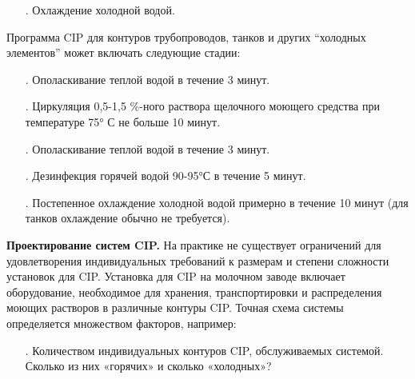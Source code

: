 {\begin{itemize}[leftmargin=2.15cm, labelwidth=0.65cm, labelsep=0.0cm]
	\item[\theitemcntr. ] Охлаждение холодной водой.
	\addtocounter{itemcntr}{1}
	
	\addtocounter{itemcntr}{1}
	
	\setcounter{itemcntr}{1}
\end{itemize}   

\par \redline Программа CIP для контуров трубопроводов, танков и других “холодных элементов” может включать следующие стадии:

\begin{itemize}[leftmargin=2.15cm, labelwidth=0.65cm, labelsep=0.0cm] 
	
	\item[\theitemcntr. ] Ополаскивание теплой водой в течение 3 минут.
	\addtocounter{itemcntr}{1}
	
	\item[\theitemcntr. ] Циркуляция 0,5-1,5 \%-ного раствора щелочного моющего средства при температуре 75° С не больше 10 минут.
	\addtocounter{itemcntr}{1}
	
	\item[\theitemcntr. ] Ополаскивание теплой водой в течение 3 минут.
	\addtocounter{itemcntr}{1}
	
	\item[\theitemcntr. ] Дезинфекция горячей водой 90-95°С в течение 5 минут.
	\addtocounter{itemcntr}{1}
	
	\item[\theitemcntr. ] Постепенное охлаждение холодной водой примерно в течение 10 минут (для танков охлаждение обычно не требуется).
	\addtocounter{itemcntr}{1}
	
	\setcounter{itemcntr}{1}
\end{itemize}


\par \redline \textbf{Проектирование систем CIP.} На практике не существует ограничений для удовлетворения индивидуальных требований к размерам и степени сложности установок для CIP. Установка для CIP на молочном заводе включает оборудование, необходимое для хранения, транспортировки и распределения моющих растворов в различные контуры CIP. Точная схема системы определяется множеством факторов, например:

\begin{itemize}[leftmargin=2.15cm, labelwidth=0.65cm, labelsep=0.0cm] 
	
	\item[\theitemcntr. ] Количеством индивидуальных контуров CIP, обслуживаемых системой. Сколько из них «горячих» и сколько «холодных»?
	\addtocounter{itemcntr}{1}
	

\end{itemize}}
